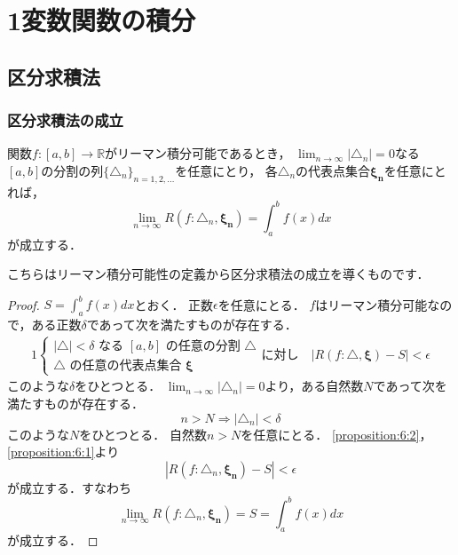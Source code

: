 \documentclass[./index]{subfiles}
\begin{document}
\section{1変数関数の積分}
\setcounter{subsection}{1}
\subsection{区分求積法}
\subsubsection{区分求積法の成立}
\begin{screen}
    \begin{proposition}
        関数$f:[a,b] \rightarrow \mathbb{R}$がリーマン積分可能であるとき，
        $\lim_{n\rightarrow\infty} |\triangle_n| = 0$なる
        $[a, b]$の分割の列$\{\triangle_n\}_{n=1,2,\dots}$を任意にとり，
        各$\triangle_n$の代表点集合$\mathbf{\xi_n}$を任意にとれば，
        \begin{equation}
            \lim_{n\rightarrow\infty} R(f: \triangle_n, \mathbf{\xi_n})
            =
            \int_a^b f(x) dx
        \end{equation}
        が成立する．
    \end{proposition}
\end{screen}

こちらはリーマン積分可能性の定義から区分求積法の成立を導くものです．

\begin{proof}
    $S = \int_a^b f(x) dx$とおく．
    正数$\epsilon$を任意にとる．
    $f$はリーマン積分可能なので，ある正数$\delta$であって次を満たすものが存在する．
    \begin{alignat}{1}
        \begin{cases}
            |\triangle| < \delta \mbox{ なる } [a, b] \mbox{ の任意の分割 } \triangle \\
            \triangle \mbox{ の任意の代表点集合 } \mathbf{\xi}
        \end{cases}
        \mbox{に対し} \quad
        |R(f: \triangle, \mathbf{\xi}) - S| < \epsilon
        \label{proposition:6:1}
    \end{alignat}
    このような$\delta$をひとつとる．
    $\lim_{n\rightarrow\infty} |\triangle_n| = 0$より，ある自然数$N$であって次を満たすものが存在する．
    \begin{equation}
        n > N \Longrightarrow |\triangle_n| < \delta
        \label{proposition:6:2}
    \end{equation}
    このような$N$をひとつとる．
    自然数$n > N$を任意にとる．
    \cref{proposition:6:2}，\cref{proposition:6:1}より
    \begin{equation}
        |R(f: \triangle_n, \mathbf{\xi_n}) - S| < \epsilon
    \end{equation}
    が成立する．すなわち
    \begin{equation}
        \lim_{n\rightarrow\infty} R(f: \triangle_n, \mathbf{\xi_n})
        =
        S
        =
        \int_a^b f(x) dx
    \end{equation}
    が成立する．
\end{proof}
\end{document}
